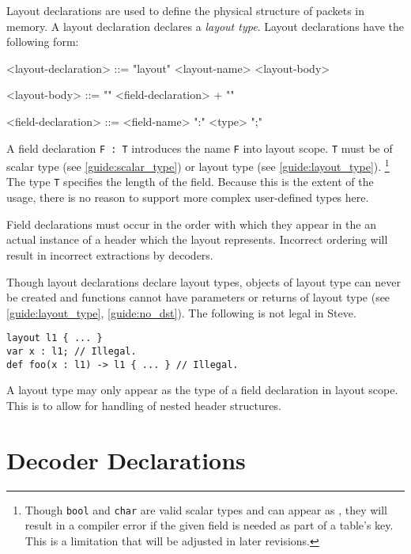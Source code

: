 Layout declarations are used to define the physical structure of packets in memory. A layout declaration declares a \textit{layout type}. Layout declarations have the following form:

\begin{minip}
\begin{grammar}
<layout-declaration> ::=
"layout" <layout-name> <layout-body>

<layout-body> ::=
"{"
	<field-declaration> +
"}"

<field-declaration> ::=
<field-name> ":" <type> ";"
\end{grammar}
\end{minip}

A field declaration \texttt{F : T} introduces the name \texttt{F} into layout scope. \texttt{T} must be of scalar type (see \ref{guide:scalar_type}) or layout type (see \ref{guide:layout_type}).
\footnote{Though \texttt{bool} and \texttt{char} are valid scalar types and can appear as , they will result in a compiler error if the given field is needed as part of a table's key. This is a limitation that will be adjusted in later revisions.} The type \texttt{T} specifies the length of the field. Because this is the extent of the usage, there is no reason to support more complex user-defined types here.

Field declarations must occur in the order with which they appear in the an actual instance of a header which the layout represents. Incorrect ordering will result in incorrect extractions by decoders.

Though layout declarations declare layout types, objects of layout type can never be created and functions cannot have parameters or returns of layout type (see \ref{guide:layout_type}, \ref{guide:no_dst}). The following is not legal in Steve. 

\begin{minip}
\begin{lstlisting}
layout l1 { ... }
var x : l1; // Illegal.
def foo(x : l1) -> l1 { ... } // Illegal.
\end{lstlisting}
\end{minip}

A layout type may only appear as the type of a field declaration in layout scope. This is to allow for handling of nested header structures.

\section{Decoder Declarations} \label{guide:decoder}

